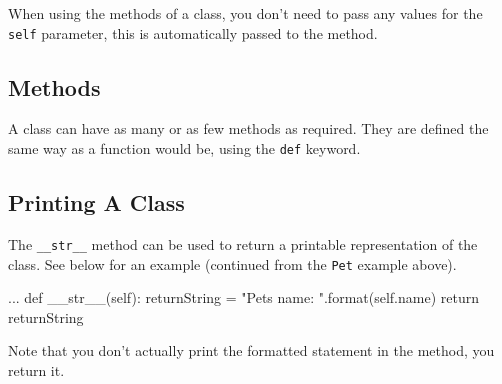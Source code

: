 When using the methods of a class, you don't need to pass any values for the \texttt{self} parameter, this is automatically passed to the method. 

\subsection*{Methods}
A class can have as many or as few methods as required. They are defined the same way as a function would be, using the \texttt{def} keyword. 

\subsection*{Printing A Class}
The \texttt{\_\_str\_\_} method can be used to return a printable representation of the class. See below for an example (continued from the \texttt{Pet} example above).
\begin{python}
...
    def __str__(self):
        returnString = "Pets name: {}".format(self.name)
        return returnString
\end{python}
Note that you don't actually print the formatted statement in the method, you return it. 